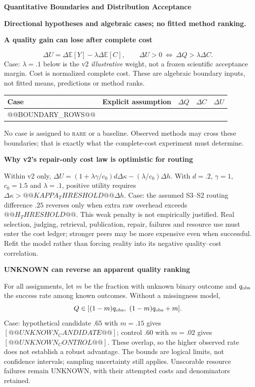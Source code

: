 \documentclass[10pt,a4paper]{article}
\newcommand{\lead}[1]{\vspace{4pt}\textbf{#1}\par}
\newcommand{\rare}{\textsc{rare}}
\newcommand{\caution}{\textcolor{red!70!black}{\textbf{Directional hypotheses and algebraic cases; no fitted method ranking.}}\par}
\begin{document}
\clearpage
{\large\bfseries Quantitative Boundaries and Distribution Acceptance}\par\caution
\lead{A quality gain can lose after complete cost}
\[
 \Delta U=\Delta\mathbb E[Y]-\lambda\Delta\mathbb E[C],\qquad
 \Delta U>0\ \Longleftrightarrow\ \Delta Q>\lambda\Delta C.
\]
Case: $\lambda=.1$ below is the v2 \emph{illustrative} weight, not a frozen
scientific acceptance margin. Cost is normalized complete cost. These are
algebraic boundary inputs, not fitted means, predictions or method ranks.
\begin{center}\small
\begin{tabularx}{\linewidth}{@{}lXrrr@{}}\toprule
Case & Explicit assumption & $\Delta Q$ & $\Delta C$ & $\Delta U$\\\midrule
@@BOUNDARY_ROWS@@
\bottomrule\end{tabularx}\end{center}
No case is assigned to \rare{} or a baseline. Observed methods may cross these
boundaries; that is exactly what the complete-cost experiment must determine.

\lead{Why v2's repair-only cost law is optimistic for routing}
Within v2 only, $\Delta U=(1+\lambda\gamma/c_0)d\Delta\kappa
-(\lambda/c_0)\Delta h$. With $d=.2$, $\gamma=1$, $c_0=1.5$ and $\lambda=.1$,
positive utility requires $\Delta\kappa>@@KAPPA_THRESHOLD@@\Delta h$.
Case: the assumed S3--S2 routing difference $.25$ reverses only when extra raw
overhead exceeds $@@H_THRESHOLD@@$. This weak penalty is not empirically justified.
Real selection, judging, retrieval, publication, repair, failures and resource
use must enter the cost ledger; stronger peers may be more expensive even when
successful. Refit the model rather than forcing reality into its negative
quality--cost correlation.

\lead{UNKNOWN can reverse an apparent quality ranking}
For all assignments, let $m$ be the fraction with unknown binary outcome and
$q_{\rm obs}$ the success rate among known outcomes. Without a missingness model,
\[
 Q\in[(1-m)q_{\rm obs},\ (1-m)q_{\rm obs}+m].
\]
Case: hypothetical candidate $.65$ with $m=.15$ gives
$[@@UNKNOWN_CANDIDATE@@]$; control $.60$ with $m=.02$ gives
$[@@UNKNOWN_CONTROL@@]$. These overlap, so the higher observed rate does not
establish a robust advantage. The bounds are logical limits, not confidence
intervals; sampling uncertainty still applies. Unscorable resource failures
remain UNKNOWN, with their attempted costs and denominators retained.
\end{document}
